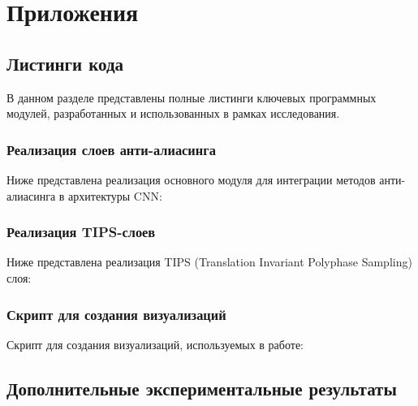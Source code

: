 \appendix
\chapter{Приложения}

\section{Листинги кода}
\label{appendix:code}

В данном разделе представлены полные листинги ключевых программных модулей, разработанных и использованных в рамках исследования.

\subsection{Реализация слоев анти-алиасинга}
\label{appendix:code:aa_layer}

Ниже представлена реализация основного модуля для интеграции методов анти-алиасинга в архитектуры CNN:



\subsection{Реализация TIPS-слоев}
\label{appendix:code:tips_layer}

Ниже представлена реализация TIPS (Translation Invariant Polyphase Sampling) слоя:



\subsection{Скрипт для создания визуализаций}
\label{appendix:code:visualizations}

Скрипт для создания визуализаций, используемых в работе:



\section{Дополнительные экспериментальные результаты}
\label{appendix:additional_results}

